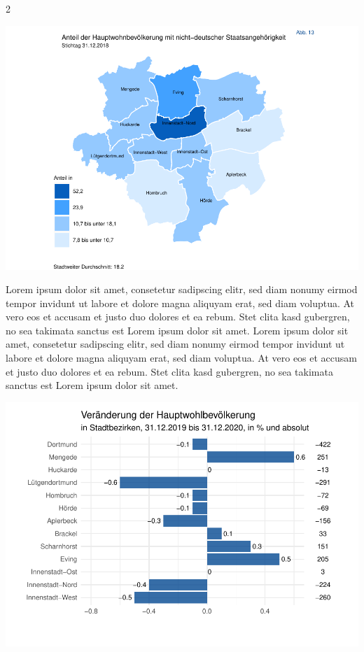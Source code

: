 \documentclass[
  a4paper,
  twoside]{article}
\begin{document}
\begin {multicols}{2}

\begin{flushright}\includegraphics[width=1\linewidth]{2021-03-02_Beispiel_files/figure-latex/Plot map-1} \end{flushright}

Lorem ipsum dolor sit amet, consetetur sadipscing elitr, sed diam nonumy
eirmod tempor invidunt ut labore et dolore magna aliquyam erat, sed diam
voluptua. At vero eos et accusam et justo duo dolores et ea rebum. Stet
clita kasd gubergren, no sea takimata sanctus est Lorem ipsum dolor sit
amet. Lorem ipsum dolor sit amet, consetetur sadipscing elitr, sed diam
nonumy eirmod tempor invidunt ut labore et dolore magna aliquyam erat,
sed diam voluptua. At vero eos et accusam et justo duo dolores et ea
rebum. Stet clita kasd gubergren, no sea takimata sanctus est Lorem
ipsum dolor sit amet.

\includegraphics[width=1\linewidth]{2021-03-02_Beispiel_files/figure-latex/unnamed-chunk-1-1}


\end{multicols}
\end{document}
